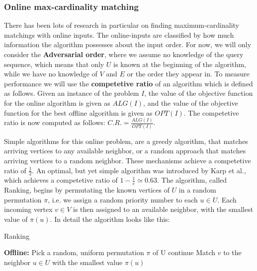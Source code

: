 \subsubsection{Online max-cardinality matching}
There has been lots of research in particular on finding maximum-cardinality matchings with online inputs. The online-inputs are classified by how much information the algorithm possesses about the input order. For now, we will only consider the \textbf{Adversarial order}, where we assume no knowledge of the query sequence, which means that only $U$ is known at the beginning of the algorithm, while we have no knowledge of $V$ and $E$ or the order they appear in.\cite{Mehta:Online} To measure performance we will use the \textbf{competetive ratio} of an algorithm which is defined as follows. Given an instance of the problem $I$, the value of the objective function for the online algorithm is given as $ALG(I)$, and the value of the objective function for the best offline algorithm is given as $OPT(I)$. The competetive ratio is now computed as follows: $C.R.=\frac{ALG(I)}{OPT(I)}$.\cite{Mehta:Online}

Simple algorithms for this online problem, are a greedy algorithm, that matches arriving vertices to any available neighbor, or a random approach that matches arriving vertices to a random neighbor. These mechanisms achieve a competetive ratio of $\frac{1}{2}$.\cite{Mehta:Online} An optimal, but yet simple algorithm was introduced by Karp et al.\cite{Karp:Online}, which achieves a competetive ratio of $1 - \frac{1}{e} \simeq 0.63$. The algorithm, called Ranking, begins by permutating the known vertices of $U$ in a random permutation $\pi$, i.e. we assign a random priority number to each $u \in U$. Each incoming vertex $v \in V$ is then assigned to an available neighbor, with the smallest value of $\pi(u)$. In detail the algorithm looks like this:

\begin{algorithm} %
    \caption{Ranking} 
    \label{alg:ranking} %
    \begin{algorithmic} %
        \State \textbf{Offline:} Pick a random, uniform permutation $\pi$ of U
                \State continue
            \EndIf
            \State Match $v$ to the neighbor $u \in U$ with the smallest value $\pi(u)$
        \EndFor
    \end{algorithmic}
\end{algorithm}